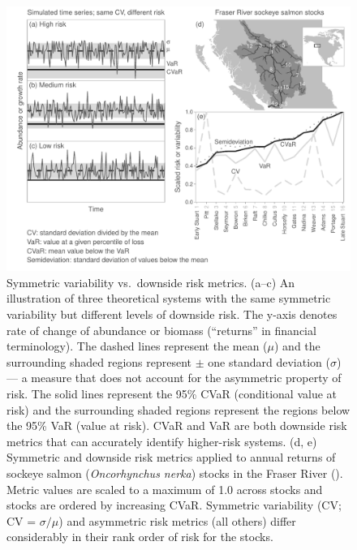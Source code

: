 \begin{figure}[htbp]
\centering
\includegraphics[width=5.5in]{risk-fig/risk-fig-bw.pdf}
\caption{
Symmetric variability vs.~downside risk metrics. (a--c) An illustration of
three theoretical systems with the same symmetric variability but different
levels of downside risk. The y-axis denotes rate of change of abundance or
biomass (``returns'' in financial terminology). The dashed lines represent the
mean ($\mu$) and the surrounding shaded regions represent $\pm$ one standard
deviation ($\sigma$) --- a measure that does not account for the asymmetric
property of risk. The solid lines represent the 95\% CVaR (conditional value
at risk) and the surrounding shaded regions represent the regions below the
95\% VaR (value at risk). CVaR and VaR are both downside risk metrics that can
accurately identify higher-risk systems. (d, e) Symmetric and downside risk
metrics applied to annual returns of sockeye salmon (\emph{Oncorhynchus
  nerka}) stocks in the Fraser River (\citep[data from][]{dorner2008}). Metric
values are scaled to a maximum of 1.0 across stocks and stocks are ordered by
increasing CVaR. Symmetric variability (CV; CV = $\sigma / \mu$) and
asymmetric risk metrics (all others) differ considerably in their rank order
of risk for the stocks.
}
\label{fig:risk}
\end{figure}
